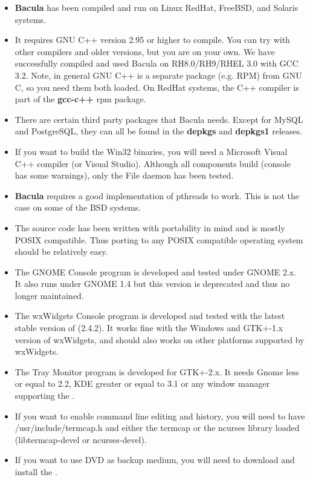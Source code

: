 \begin{itemize}
\item {\bf Bacula} has been compiled and run on Linux RedHat, FreeBSD,  and
Solaris systems. 
\item It requires GNU C++ version 2.95 or higher to compile. You can try  with
other compilers and older versions, but you are on your own.  We have
successfully compiled and used Bacula on RH8.0/RH9/RHEL 3.0  with GCC 3.2.
Note, in general GNU C++ is a separate package (e.g.  RPM) from GNU C, so you
need them both loaded. On RedHat systems,  the C++ compiler is part of the
{\bf gcc-c++} rpm package. 
\item There are certain third party packages that Bacula needs.  Except for
MySQL and PostgreSQL, they can all be found in the  {\bf depkgs} and {\bf
depkgs1} releases. 
\item If you want to build the Win32 binaries, you will need a  Microsoft
Visual C++ compiler (or Visual Studio).  Although all components build
(console has  some warnings), only the File daemon has been tested. 
\item {\bf Bacula} requires a good implementation of pthreads to work.  This
is not the case on some of the BSD systems. 
\item The source code has been written with portability in mind and is  mostly
POSIX compatible. Thus porting to any POSIX compatible  operating system
should be relatively easy. 
\item The GNOME Console program is developed and tested under GNOME 2.x. It 
also runs under GNOME 1.4 but this version is deprecated and  thus no longer
maintained. 
\item The wxWidgets Console program is developed and tested with the latest 
stable version of 
 (2.4.2).  It works fine with the
Windows and GTK+-1.x version of wxWidgets, and should  also works on other
platforms supported by wxWidgets. 
\item The Tray Monitor program is developed for GTK+-2.x. It needs  Gnome less
or equal to 2.2, KDE greater or equal to 3.1 or any window manager supporting
the  
. 
\item If you want to enable command line editing and history, you will  need
to have /usr/include/termcap.h and either the termcap or the  ncurses library
loaded (libtermcap-devel or ncurses-devel). 
\item If you want to use DVD as backup medium, you will need to download  and
install the  
. 
\end{itemize}

